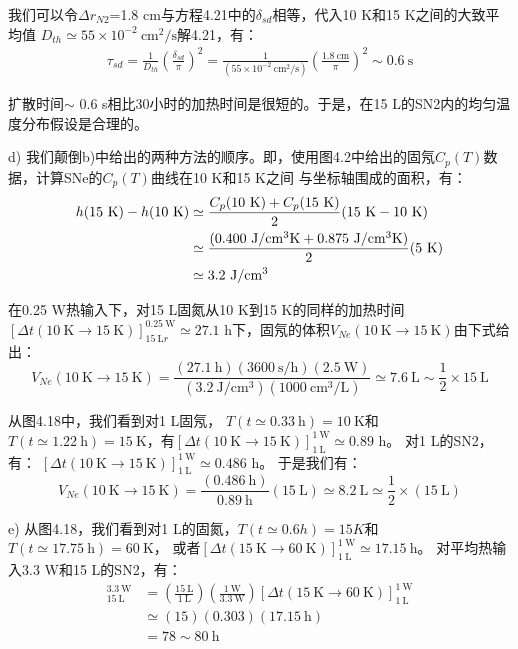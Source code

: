 我们可以令$\Delta r_{N2}$=1.8 cm与方程4.21中的$\delta_{sd}$相等，代入10 K和15 K之间的大致平均值
$D_{th}\simeq 55\times10^{−2}\ \mathrm{cm^2/s}$解4.21，有：
\begin{align*}%
\tau_{sd}=\frac{1}{D_{th}}(\frac{\delta_{sd}}{\pi})^2
=\frac{1}{(55\times 10^{-2}\ \mathrm{cm^2/s})}(\frac{1.8\ \mathrm{cm}}{\pi})^2\sim 0.6\ \mathrm{s} \tag{4.21}
\end{align*}

扩散时间$\sim$ 0.6 s相比30小时的加热时间是很短的。于是，在15 L的SN2内的均匀温度分布假设是合理的。

d) 我们颠倒b)中给出的两种方法的顺序。即，使用图4.2中给出的固氖$C_p(T)$数据，计算SNe的$C_p(T)$曲线在10 K和15 K之间
与坐标轴围成的面积，有：
\begin{align*}%
h(15\ \mathrm{K})-h(10\ \mathrm{K})&\simeq\frac{C_p(10\ \mathrm{K})+C_p(15\ \mathrm{K})}{2}(15\ \mathrm{K}-10\ \mathrm{K})\\\notag
&\simeq\frac{(0.400\ \mathrm{J/cm^3K}+0.875\ \mathrm{J/cm^3K})}{2}(5\ \mathrm{K})\\\notag
&\simeq 3.2\ \mathrm{J/cm^3}
\end{align*}

在0.25 W热输入下，对15 L固氮从10 K到15 K的同样的加热时间$[\Delta t(10\ \mathrm{K}\rightarrow 15\ \mathrm{K})]_{15\ \mathrm{L}r}^{0.25\ \mathrm{W}}\simeq 27.1$ h下，固氖的体积$V_{Ne}(10\ \mathrm{K}\rightarrow 15\ \mathrm{K})$由下式给出：
\begin{equation*}%
V_{Ne}(10\ \mathrm{K} \rightarrow 15\ \mathrm{K})=\frac{(27.1\ \mathrm{h})(3600\ \mathrm{s/h} )(2.5\ \mathrm{W})}{(3.2\ \mathrm{J/cm^3})(1000 \ \mathrm{cm^3/L})}
\simeq 7.6\ \mathrm{L}\sim\frac{1}{2}\times 15\ \mathrm{L}
\end{equation*}

从图4.18中，我们看到对1 L固氖， $T(t\simeq 0.33\ \mathrm{h})=10\ \mathrm{K}$和$T(t\simeq
1.22\ \mathrm{h})=15\ \mathrm{K}$，有$[\Delta t(10\ \mathrm{K}\rightarrow 15\ \mathrm{K})]_{1\ \mathrm{L}}^{1\ \mathrm{W}}\simeq 0.89$ h。
对1 L的SN2，有：
$[\Delta t(10\ \mathrm{K}\rightarrow 15\ \mathrm{K})]_{1\ \mathrm{L}}^{1\ \mathrm{W}}\simeq 0.486$ h。
于是我们有：
\begin{equation*}%
V_{Ne}(10\ \mathrm{K}\rightarrow 15\ \mathrm{K})=\frac{(0.486\ \mathrm{h})}{0.89\ \mathrm{h}}(15\ \mathrm{L})\simeq 8.2 \ \mathrm{L}\simeq\frac{1}{2}\times(15\ \mathrm{L})
\end{equation*}

e) 从图4.18，我们看到对1 L的固氮，$T(t\simeq 0.6 h)=15 K$和$T(t\simeq 17.75\ \mathrm{h}) = 60\ \mathrm{K}$，
或者$[\Delta t(15\ \mathrm{K}\rightarrow 60\ \mathrm{K})]_{1\ \mathrm{L}}^{1\ \mathrm{W}}\simeq 17.15\ \mathrm{h}$。
对平均热输入3.3 W和15 L的SN2，有：
\begin{align*}%
[\Delta t(15\ \mathrm{K} \rightarrow 60\ \mathrm{K})]_{15\ \mathrm{L}}^{3.3\ \mathrm{W}}&=(\frac{15\ \mathrm{L}}{1\ \mathrm{L}})(\frac{1\ \mathrm{W}}{3.3\ \mathrm{W}})[\Delta t(15\ \mathrm{K}\rightarrow 60\ \mathrm{K})]_{1\ \mathrm{L}}^{1\ \mathrm{W}}\\
&\simeq(15)(0.303)(17.15\ \mathrm{h})\\
&=78\sim 80\ \mathrm{h}
\end{align*}

